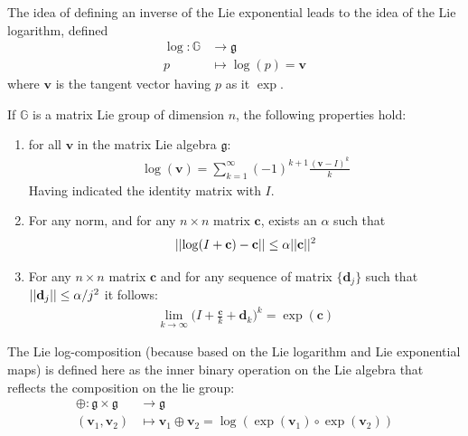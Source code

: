 The idea of defining an inverse of the Lie exponential leads to the idea of the Lie logarithm, defined
\begin{align*}
\log : \mathbb{G} & \longrightarrow \mathfrak{g} \\
p &\longmapsto \log (p)  =  \mathbf{v}   
\end{align*}
where $\mathbf{v}  $ is the tangent vector having $p$ as it $\exp$.

\noindent
If $\mathbb{G}$ is a matrix Lie group of dimension $n$, the following properties hold:
\begin{enumerate}
	\item for all $\mathbf{v}$ in the matrix Lie algebra $\mathfrak{g}$:
	\begin{align}\label{eq:log_as_inf_sum}
	\log(\mathbf{v}) = \sum_{k=1}^{\infty}(-1)^{k+1} \frac{(\mathbf{v}-I)^{k} }{k}
	\end{align}
	Having indicated the identity matrix with $I$.
	\item For any norm, and for any $n\times n$ matrix $\mathbf{c}$, exists an $\alpha$ such that 
	\begin{align}\label{eq:prop_matrix_diff_log}
	\vert\lvert  \log(I + \mathbf{c}) - \mathbf{c}  \rvert\vert  \leq \alpha \vert\lvert  \mathbf{c} \rvert\vert^{2}
	\end{align}
	\item For any $n\times n$ matrix $\mathbf{c}$ and for any sequence of matrix $\{\mathbf{d}_{j}\}$ such that  $\vert\lvert  \mathbf{d}_{j} \rvert\vert \leq \alpha/j^2$ it follows:
	\begin{align}\label{eq:prop_matrix_lim}
	\lim_{k\rightarrow \infty} \big( I + \frac{\mathbf{c}}{k} + \mathbf{d}_{k} \big)^{k} = \exp{(\mathbf{c})}
	\end{align}
\end{enumerate} 

The Lie log-composition (because based on the Lie logarithm and Lie exponential maps) is defined here as the inner binary operation on the Lie algebra that reflects the composition on the lie group:
\begin{align}\label{eq:main_def_log_composition}
\oplus : \mathfrak{g} \times \mathfrak{g} & \longrightarrow \mathfrak{g}    \\
(\mathbf{v}_{1}, \mathbf{v}_{2}) &\longmapsto \mathbf{v}_{1}\oplus \mathbf{v}_{2} =  \log(\exp(\mathbf{v}_1)\circ \exp(\mathbf{v}_2))
\end{align}

